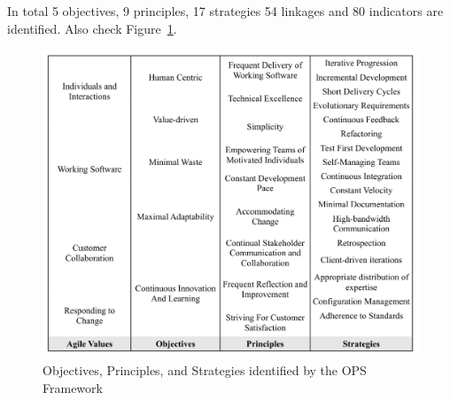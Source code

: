 
In total 5 objectives, 9 principles, 17 strategies 54 linkages and 80 indicators are identified. Also check Figure~\ref{objectives_principles_strategies}.

\begin{figure} [H]
\centerline{\includegraphics[scale=0.75]{include/relatedwork/fig/ops.pdf}}
\caption{Objectives, Principles, and Strategies identified by the OPS Framework} 
\label{objectives_principles_strategies}
\end{figure} 

